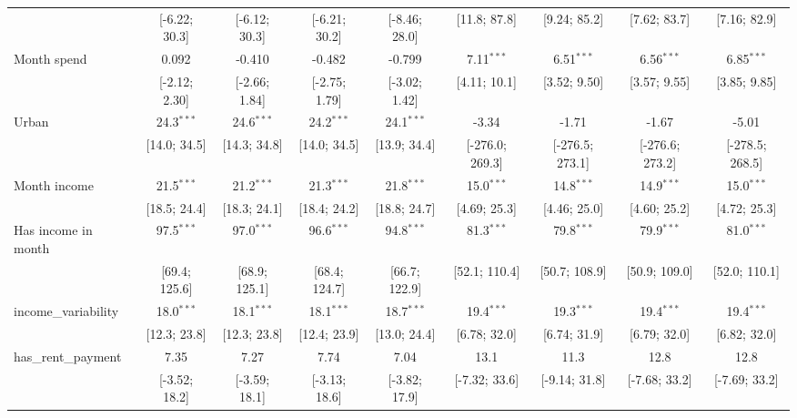 \begin{table}[htbp]
\begin{threeparttable}[b]
\begin{tabular}{lcccccccc}
                                  & [-6.22; 30.3]  & [-6.12; 30.3]  & [-6.21; 30.2]  & [-8.46; 28.0]  & [11.8; 87.8]    & [9.24; 85.2]    & [7.62; 83.7]    & [7.16; 82.9]\\   
         Month spend              & 0.092          & -0.410         & -0.482         & -0.799         & 7.11$^{***}$    & 6.51$^{***}$    & 6.56$^{***}$    & 6.85$^{***}$\\   
                                  & [-2.12; 2.30]  & [-2.66; 1.84]  & [-2.75; 1.79]  & [-3.02; 1.42]  & [4.11; 10.1]    & [3.52; 9.50]    & [3.57; 9.55]    & [3.85; 9.85]\\   
         Urban                    & 24.3$^{***}$   & 24.6$^{***}$   & 24.2$^{***}$   & 24.1$^{***}$   & -3.34           & -1.71           & -1.67           & -5.01\\   
                                  & [14.0; 34.5]   & [14.3; 34.8]   & [14.0; 34.5]   & [13.9; 34.4]   & [-276.0; 269.3] & [-276.5; 273.1] & [-276.6; 273.2] & [-278.5; 268.5]\\   
         Month income             & 21.5$^{***}$   & 21.2$^{***}$   & 21.3$^{***}$   & 21.8$^{***}$   & 15.0$^{***}$    & 14.8$^{***}$    & 14.9$^{***}$    & 15.0$^{***}$\\   
                                  & [18.5; 24.4]   & [18.3; 24.1]   & [18.4; 24.2]   & [18.8; 24.7]   & [4.69; 25.3]    & [4.46; 25.0]    & [4.60; 25.2]    & [4.72; 25.3]\\   
         Has income in month      & 97.5$^{***}$   & 97.0$^{***}$   & 96.6$^{***}$   & 94.8$^{***}$   & 81.3$^{***}$    & 79.8$^{***}$    & 79.9$^{***}$    & 81.0$^{***}$\\   
                                  & [69.4; 125.6]  & [68.9; 125.1]  & [68.4; 124.7]  & [66.7; 122.9]  & [52.1; 110.4]   & [50.7; 108.9]   & [50.9; 109.0]   & [52.0; 110.1]\\   
         income\_variability      & 18.0$^{***}$   & 18.1$^{***}$   & 18.1$^{***}$   & 18.7$^{***}$   & 19.4$^{***}$    & 19.3$^{***}$    & 19.4$^{***}$    & 19.4$^{***}$\\   
                                  & [12.3; 23.8]   & [12.3; 23.8]   & [12.4; 23.9]   & [13.0; 24.4]   & [6.78; 32.0]    & [6.74; 31.9]    & [6.79; 32.0]    & [6.82; 32.0]\\   
         has\_rent\_payment       & 7.35           & 7.27           & 7.74           & 7.04           & 13.1            & 11.3            & 12.8            & 12.8\\   
                                  & [-3.52; 18.2]  & [-3.59; 18.1]  & [-3.13; 18.6]  & [-3.82; 17.9]  & [-7.32; 33.6]   & [-9.14; 31.8]   & [-7.68; 33.2]   & [-7.69; 33.2]\\   

\end{tabular}
\end{threeparttable}
\end{table}
